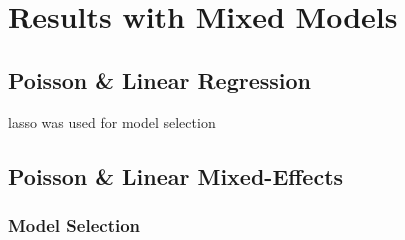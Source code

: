 \section{Results with Mixed Models}
\subsection{Poisson \& Linear Regression}
lasso was used for model selection
\subsection{Poisson \& Linear Mixed-Effects}
\subsubsection{Model Selection}






